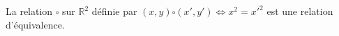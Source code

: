 La relation $\square$ sur $\mathbb R^2$ définie par $(x,y)\square (x',y') \iff x^2=x'^2$ est une relation d'équivalence.

\begin{reponses}
\end{reponses}

